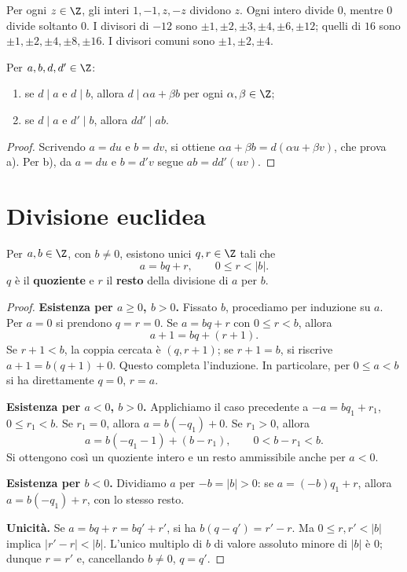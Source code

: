 \begin{esempio}
Per ogni $z\in\Z$, gli interi $1,-1,z,-z$ dividono $z$. Ogni intero divide $0$, mentre $0$ divide soltanto $0$. I divisori di $-12$ sono $\pm1,\pm2,\pm3,\pm4,\pm6,\pm12$; quelli di $16$ sono $\pm1,\pm2,\pm4,\pm8,\pm16$. I divisori comuni sono $\pm1,\pm2,\pm4$.
\end{esempio}

\begin{proposizione}\label{prop:combinazioni}
Per $a,b,d,d'\in\Z$:
\begin{enumerate}[label=\alph*)]
  \item se $d\mid a$ e $d\mid b$, allora $d\mid\alpha a+\beta b$ per ogni $\alpha,\beta\in\Z$;
  \item se $d\mid a$ e $d'\mid b$, allora $dd'\mid ab$.
\end{enumerate}
\end{proposizione}
\begin{proof}
Scrivendo $a=du$ e $b=dv$, si ottiene $\alpha a+\beta b=d(\alpha u+\beta v)$, che prova a). Per b), da $a=du$ e $b=d'v$ segue $ab=dd'(uv)$.
\end{proof}

\section{Divisione euclidea}
\begin{teorema}\label{teo:divisione}
Per $a,b\in\Z$, con $b\ne0$, esistono unici $q,r\in\Z$ tali che
\[
a=bq+r,\qquad 0\le r<|b|.
\]
$q$ è il \textbf{quoziente} e $r$ il \textbf{resto} della divisione di $a$ per $b$.
\end{teorema}
\begin{proof}
\textbf{Esistenza per $a\ge0$, $b>0$.} Fissato $b$, procediamo per induzione su $a$. Per $a=0$ si prendono $q=r=0$. Se $a=bq+r$ con $0\le r<b$, allora
\[
a+1=bq+(r+1).
\]
Se $r+1<b$, la coppia cercata è $(q,r+1)$; se $r+1=b$, si riscrive $a+1=b(q+1)+0$. Questo completa l'induzione. In particolare, per $0\le a<b$ si ha direttamente $q=0$, $r=a$.

\textbf{Esistenza per $a<0$, $b>0$.} Applichiamo il caso precedente a $-a=bq_1+r_1$, $0\le r_1<b$. Se $r_1=0$, allora $a=b(-q_1)+0$. Se $r_1>0$, allora
\[
a=b(-q_1-1)+(b-r_1),\qquad 0<b-r_1<b.
\]
Si ottengono così un quoziente intero e un resto ammissibile anche per $a<0$.

\textbf{Esistenza per $b<0$.} Dividiamo $a$ per $-b=|b|>0$: se $a=(-b)q_1+r$, allora $a=b(-q_1)+r$, con lo stesso resto.

\textbf{Unicità.} Se $a=bq+r=bq'+r'$, si ha $b(q-q')=r'-r$. Ma $0\le r,r'<|b|$ implica $|r'-r|<|b|$. L'unico multiplo di $b$ di valore assoluto minore di $|b|$ è $0$; dunque $r=r'$ e, cancellando $b\ne0$, $q=q'$.
\end{proof}

